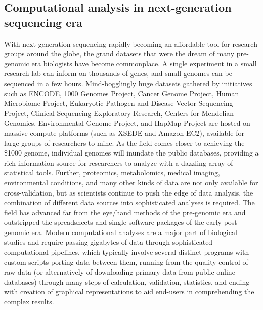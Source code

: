 \documentclass[ChapterTOCs,krantz2]{krantz} %
\begin{document}
\subsection{Computational analysis in next-generation sequencing era}

With next-generation sequencing rapidly becoming an affordable tool
for research groups around the globe, the grand datasets that were the
dream of many pre-genomic era biologists have become commonplace.  A single
experiment in a small research lab can inform on
thousands of genes, and small genomes can be sequenced in a few hours.
Mind-bogglingly huge datasets gathered by initiatives such as ENCODE\cite{Encode2004,Myers2011}, 
1000 Genomes Project\cite{Altshuler2010}, 
Cancer Genome Project\cite{Cosmic2011}, Human Microbiome Project\cite{Lewis2012}, 
Eukaryotic Pathogen and Disease Vector Sequencing Project\cite{EPDVSP}, 
Clinical Sequencing Exploratory Research\cite{CSER}, 
Centers for Mendelian Genomics\cite{CMG}, Environmental Genome Project\cite{EGP}, 
and HapMap Project\cite{IHP} are hosted on
massive compute platforms
(such as XSEDE\cite{Xsede} and Amazon EC2\cite{AEC2}), available for large groups of 
researchers to mine.  As the field comes closer to achieving the 
\$1000 genome, individual genomes will inundate the 
public databases, providing a rich information source for
researchers to analyze with a dazzling array of statistical tools.  Further,
proteomics, metabolomics, medical imaging, environmental conditions, and many
other kinds of data are not only available for cross-validation, but as
scientists continue to push the edge of data analysis, the combination of
different data sources into sophisticated analyses is required.  The field has
advanced far from the eye/hand methods of the pre-genomic era and outstripped
the spreadsheets and single software packages of the early post-genomic era.  
Modern computational analyses are a major part of biological studies
and require passing gigabytes of data through sophisticated computational
pipelines, which typically involve several distinct programs with custom
scripts porting data between them, running from the quality control of raw data
(or alternatively of downloading primary data from public online databases)
through many steps of calculation, validation, statistics, and ending with
creation of graphical representations to aid end-users in comprehending the
complex results.
\end{document}
